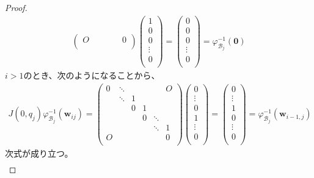 \documentclass[dvipdfmx]{jsarticle}
\begin{document}
\begin{proof}
\begin{align*}
\begin{pmatrix}
O & \  & \  & \  & 0 \\
\end{pmatrix}\begin{pmatrix}
1 \\
0 \\
0 \\
 \vdots \\
0 \\
\end{pmatrix} = \begin{pmatrix}
0 \\
0 \\
0 \\
 \vdots \\
0 \\
\end{pmatrix} = \varphi_{\mathcal{B}_{j}}^{- 1}\left( \mathbf{0} \right)
\end{align*}
$i > 1$のとき、次のようになることから、
\begin{align*}
J\left( 0,q_{j} \right)\varphi_{\mathcal{B}_{j}}^{- 1}\left( \mathbf{w}_{ij} \right) = \begin{pmatrix}
0 & \ddots & \  & \  & \  & O \\
\  & \ddots & 1 & \  & \  & \  \\
\  & \  & 0 & 1 & \  & \  \\
\  & \  & \  & 0 & \ddots & \  \\
\  & \  & \  & \  & \ddots & 1 \\
O & \  & \  & \  & \  & 0 \\
\end{pmatrix}\begin{pmatrix}
0 \\
 \vdots \\
0 \\
1 \\
 \vdots \\
0 \\
\end{pmatrix} = \begin{pmatrix}
0 \\
 \vdots \\
1 \\
0 \\
 \vdots \\
0 \\
\end{pmatrix} = \varphi_{\mathcal{B}_{j}}^{- 1}\left( \mathbf{w}_{i - 1,j} \right)
\end{align*}
次式が成り立つ。
\begin{align*}

\end{align*}
\end{proof}
\end{document}
